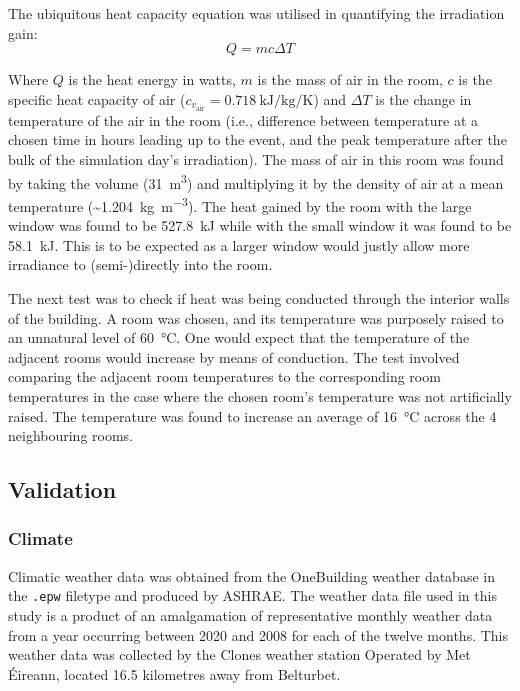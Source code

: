 The ubiquitous heat capacity equation was utilised in quantifying the irradiation gain: 
\begin{equation}
    Q = mc\Delta T 
\end{equation} 

Where $Q$ is the heat energy in watts, $m$ is the mass of air in the room, $c$ is the specific heat capacity of air ($c_{v_\text{air}} = \qty{0.718}{\kilo\joule\per\kilo\gram\per\kelvin}$) and $\Delta T$ is the change in temperature of the air in the room (i.e., difference between temperature at a chosen time in hours leading up to the event, and the peak temperature after the bulk of the simulation day's irradiation). The mass of air in this room was found by taking the volume (\qty{31}{\meter\cubed}) and multiplying it by the density of air at a mean temperature (\sim \qty{1.204}{\kilo\gram\per\cubic\meter}). 
The heat gained by the room with the large window was found to be \qty{527.8}{\kilo\joule} while with the small window it was found to be \qty{58.1}{\kilo\joule}. This is to be expected as a larger window would justly allow more irradiance to (semi-)directly into the room. 

The next test was to check if heat was being conducted through the interior walls of the building. A room was chosen, and its temperature was purposely raised to an unnatural level of \qty{60}{\celsius}. One would expect that the temperature of the adjacent rooms would increase by means of conduction. The test involved comparing the adjacent room temperatures to the corresponding room temperatures in the case where the chosen room's temperature was not artificially raised. The temperature was found to increase an average of \qty{16}{\celsius} across the 4 neighbouring rooms. 


\subsection{Validation} \label{subsubsec:validation}

\subsubsection{Climate}
Climatic weather data was obtained from the OneBuilding weather database \cite{onebuilding_climateonebuildingorg_nodate} in the \texttt{.epw} filetype and produced by ASHRAE. The weather data file used in this study is a product of an amalgamation of representative monthly weather data from a year occurring between 2020 and 2008 for each of the twelve months. This weather data was collected by the Clones weather station Operated by Met Éireann, located 16.5 kilometres away from Belturbet. 

